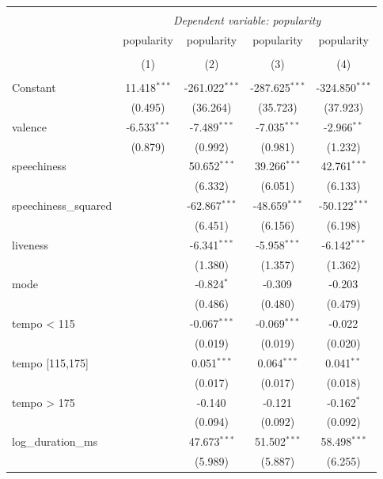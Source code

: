 \begin{table}[!htbp] \centering
\begin{tabular}{@{\extracolsep{5pt}}lcccc}
\\[-1.8ex]\hline
\hline \\[-1.8ex]
& \multicolumn{4}{c}{\textit{Dependent variable: popularity}} \
\cr \cline{2-5}
\\[-1.8ex] & \multicolumn{1}{c}{popularity} & \multicolumn{1}{c}{popularity} & \multicolumn{1}{c}{popularity} & \multicolumn{1}{c}{popularity}  \\
\\[-1.8ex] & (1) & (2) & (3) & (4) \\
\hline \\[-1.8ex]
 Constant & 11.418$^{***}$ & -261.022$^{***}$ & -287.625$^{***}$ & -324.850$^{***}$ \\
& (0.495) & (36.264) & (35.723) & (37.923) \\
 valence & -6.533$^{***}$ & -7.489$^{***}$ & -7.035$^{***}$ & -2.966$^{**}$ \\
& (0.879) & (0.992) & (0.981) & (1.232) \\
 speechiness & & 50.652$^{***}$ & 39.266$^{***}$ & 42.761$^{***}$ \\
& & (6.332) & (6.051) & (6.133) \\
 speechiness_squared & & -62.867$^{***}$ & -48.659$^{***}$ & -50.122$^{***}$ \\
& & (6.451) & (6.156) & (6.198) \\
 liveness & & -6.341$^{***}$ & -5.958$^{***}$ & -6.142$^{***}$ \\
& & (1.380) & (1.357) & (1.362) \\
 mode & & -0.824$^{*}$ & -0.309$^{}$ & -0.203$^{}$ \\
& & (0.486) & (0.480) & (0.479) \\
 tempo < 115 & & -0.067$^{***}$ & -0.069$^{***}$ & -0.022$^{}$ \\
& & (0.019) & (0.019) & (0.020) \\
 tempo [115,175] & & 0.051$^{***}$ & 0.064$^{***}$ & 0.041$^{**}$ \\
& & (0.017) & (0.017) & (0.018) \\
 tempo > 175 & & -0.140$^{}$ & -0.121$^{}$ & -0.162$^{*}$ \\
& & (0.094) & (0.092) & (0.092) \\
 log_duration_ms & & 47.673$^{***}$ & 51.502$^{***}$ & 58.498$^{***}$ \\
& & (5.989) & (5.887) & (6.255) \\

\end{tabular}
\end{table}
